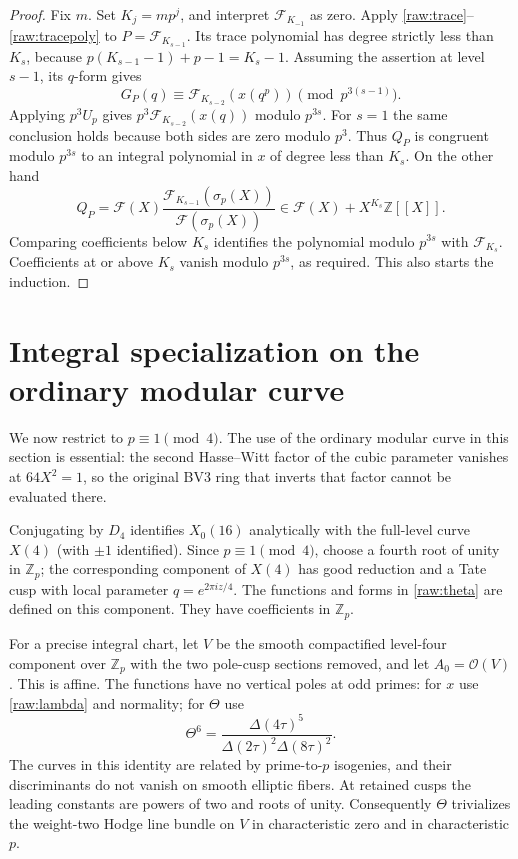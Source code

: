 \documentclass[11pt,a4paper]{article}
\begin{document}
\begin{proof}
Fix $m$.  Set $K_j=mp^j$, and interpret $\mathcal F_{K_{-1}}$ as zero.
Apply \eqref{raw:trace}--\eqref{raw:tracepoly} to
$P=\mathcal F_{K_{s-1}}$.  Its trace polynomial has degree strictly less
than $K_s$, because $p(K_{s-1}-1)+p-1=K_s-1$.
Assuming the assertion at level $s-1$, its $q$-form gives
\[
 G_P(q)\equiv\mathcal F_{K_{s-2}}(x(q^p))
                    \pmod{p^{3(s-1)}}.
\]
Applying $p^3U_p$ gives $p^3\mathcal F_{K_{s-2}}(x(q))$ modulo $p^{3s}$.
For $s=1$ the same conclusion holds because both sides are zero modulo
$p^3$.  Thus $Q_P$ is congruent modulo $p^{3s}$ to an integral polynomial
in $x$ of degree less than $K_s$.
On the other hand
\[
 Q_P=\mathcal F(X)
       \frac{\mathcal F_{K_{s-1}}(\sigma_p(X))}
            {\mathcal F(\sigma_p(X))}
     \in\mathcal F(X)+X^{K_s}\mathbb Z[[X]].
\]
Comparing coefficients below $K_s$ identifies the polynomial modulo
$p^{3s}$ with $\mathcal F_{K_s}$.  Coefficients at or above $K_s$ vanish
modulo $p^{3s}$, as required.  This also starts the induction.
\end{proof}

\section{Integral specialization on the ordinary modular curve}\label{sec:ordinary}

We now restrict to $p\equiv1\pmod4$.  The use of the ordinary modular curve
in this section is essential: the second Hasse--Witt factor of the
cubic parameter vanishes at $64X^2=1$, so the original BV3 ring that
inverts that factor cannot be evaluated there.

Conjugating by $D_4$ identifies $X_0(16)$ analytically with the full-level
curve $X(4)$ (with $\pm1$ identified).  Since $p\equiv1\pmod4$, choose a
fourth root of unity in $\mathbb Z_p$; the corresponding component of
$X(4)$ has good reduction and a Tate cusp with local parameter
$q=e^{2\pi iz/4}$.  The functions and forms in \eqref{raw:theta} are
defined on this component.  They have coefficients in $\mathbb Z_p$.

For a precise integral chart, let $V$ be the smooth compactified
level-four component over $\mathbb Z_p$ with the two pole-cusp sections
removed, and let $A_0=\mathcal O(V)$. This is affine. The functions have
no vertical poles at odd primes: for $x$ use
\eqref{raw:lambda} and normality; for $\Theta$ use
\[
 \Theta^6=\frac{\Delta(4\tau)^5}
                  {\Delta(2\tau)^2\Delta(8\tau)^2}.
\]
The curves in this identity are related by prime-to-$p$ isogenies, and
their discriminants do not vanish on smooth elliptic fibers.
At retained cusps the leading constants are powers of two and roots
of unity. Consequently $\Theta$ trivializes the weight-two Hodge line
bundle on $V$ in characteristic zero and in characteristic $p$.
\end{document}
